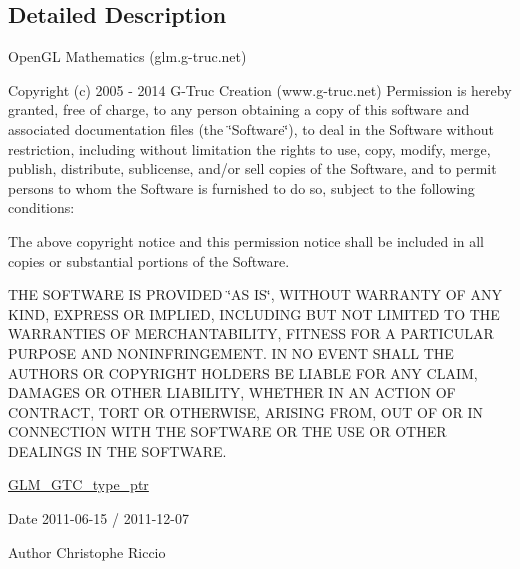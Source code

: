 \subsection{Detailed Description}
Open\+GL Mathematics (glm.\+g-\/truc.\+net)

Copyright (c) 2005 -\/ 2014 G-\/\+Truc Creation (www.\+g-\/truc.\+net) Permission is hereby granted, free of charge, to any person obtaining a copy of this software and associated documentation files (the \char`\"{}\+Software\char`\"{}), to deal in the Software without restriction, including without limitation the rights to use, copy, modify, merge, publish, distribute, sublicense, and/or sell copies of the Software, and to permit persons to whom the Software is furnished to do so, subject to the following conditions\+:

The above copyright notice and this permission notice shall be included in all copies or substantial portions of the Software.

T\+HE S\+O\+F\+T\+W\+A\+RE IS P\+R\+O\+V\+I\+D\+ED \char`\"{}\+A\+S I\+S\char`\"{}, W\+I\+T\+H\+O\+UT W\+A\+R\+R\+A\+N\+TY OF A\+NY K\+I\+ND, E\+X\+P\+R\+E\+SS OR I\+M\+P\+L\+I\+ED, I\+N\+C\+L\+U\+D\+I\+NG B\+UT N\+OT L\+I\+M\+I\+T\+ED TO T\+HE W\+A\+R\+R\+A\+N\+T\+I\+ES OF M\+E\+R\+C\+H\+A\+N\+T\+A\+B\+I\+L\+I\+TY, F\+I\+T\+N\+E\+SS F\+OR A P\+A\+R\+T\+I\+C\+U\+L\+AR P\+U\+R\+P\+O\+SE A\+ND N\+O\+N\+I\+N\+F\+R\+I\+N\+G\+E\+M\+E\+NT. IN NO E\+V\+E\+NT S\+H\+A\+LL T\+HE A\+U\+T\+H\+O\+RS OR C\+O\+P\+Y\+R\+I\+G\+HT H\+O\+L\+D\+E\+RS BE L\+I\+A\+B\+LE F\+OR A\+NY C\+L\+A\+IM, D\+A\+M\+A\+G\+ES OR O\+T\+H\+ER L\+I\+A\+B\+I\+L\+I\+TY, W\+H\+E\+T\+H\+ER IN AN A\+C\+T\+I\+ON OF C\+O\+N\+T\+R\+A\+CT, T\+O\+RT OR O\+T\+H\+E\+R\+W\+I\+SE, A\+R\+I\+S\+I\+NG F\+R\+OM, O\+UT OF OR IN C\+O\+N\+N\+E\+C\+T\+I\+ON W\+I\+TH T\+HE S\+O\+F\+T\+W\+A\+RE OR T\+HE U\+SE OR O\+T\+H\+ER D\+E\+A\+L\+I\+N\+GS IN T\+HE S\+O\+F\+T\+W\+A\+RE.

\hyperlink{group__gtc__type__ptr}{G\+L\+M\+\_\+\+G\+T\+C\+\_\+type\+\_\+ptr}

\begin{DoxyDate}{Date}
2011-\/06-\/15 / 2011-\/12-\/07 
\end{DoxyDate}
\begin{DoxyAuthor}{Author}
Christophe Riccio 
\end{DoxyAuthor}
